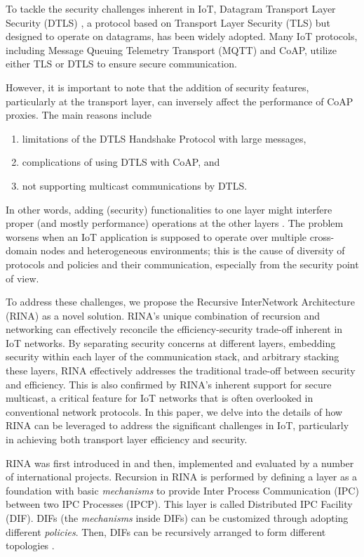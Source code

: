 \documentclass{ieeeaccess}
\begin{document}
To tackle the security challenges inherent in IoT, Datagram Transport Layer Security (DTLS) \cite{rfc6347}, a protocol based on Transport Layer Security (TLS) but designed to operate on datagrams, has been widely adopted. Many IoT protocols, including Message Queuing Telemetry Transport (MQTT) \cite{mqtt2014} and CoAP, utilize either TLS or DTLS to ensure secure communication.

However, it is important to note that the addition of security features, particularly at the transport layer, can inversely affect the performance of CoAP proxies. The main reasons include \cite{grammatikis2019securing}
\begin{enumerate}
	\item limitations of the DTLS Handshake Protocol with large messages,
	\item complications of using DTLS with CoAP, and
	\item not supporting multicast communications by DTLS.
\end{enumerate}

In other words, adding (security) functionalities to one layer might interfere proper (and mostly performance) operations at the other layers \cite{7005393}. The problem worsens when an IoT application is supposed to operate over multiple cross-domain nodes and heterogeneous environments; this is the cause of diversity of protocols and policies and their communication, especially from the security point of view.

To address these challenges, we propose the Recursive InterNetwork Architecture (RINA) as a novel solution. RINA's unique combination of recursion and networking can effectively reconcile the efficiency-security trade-off inherent in IoT networks. By separating security concerns at different layers, embedding security within each layer of the communication stack, and arbitrary stacking these layers, RINA effectively addresses the traditional trade-off between security and efficiency. This is also confirmed by RINA's inherent support for secure multicast, a critical feature for IoT networks that is often overlooked in conventional network protocols. In this paper, we delve into the details of how RINA can be leveraged to address the significant challenges in IoT, particularly in achieving both transport layer efficiency and security.


RINA was first introduced in \cite{Day:2008:PNA} and then, implemented and evaluated by a number of international projects. Recursion in RINA is performed by defining a layer as a foundation with basic \textit{mechanisms} to provide Inter Process Communication (IPC) between two IPC Processes (IPCP). This layer is called Distributed IPC Facility (DIF). DIFs (the \textit{mechanisms} inside DIFs) can be customized through adopting different \textit{policies}. Then, DIFs can be recursively arranged to form different topologies \cite{peymanICC16}. 
\end{document}
